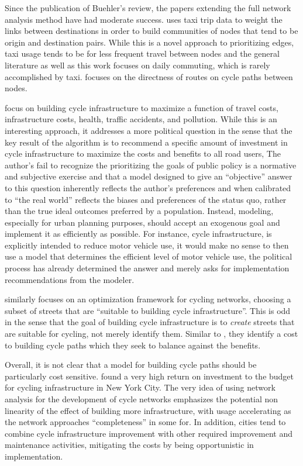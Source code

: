 Since the publication of Buehler's review, the papers extending the full network analysis method have had moderate success. \cite{akbarzadeh2018designing} uses taxi trip data to weight the links between destinations in order to build communities of nodes that tend to be origin and destination pairs. While this is a novel approach to prioritizing edges, taxi usage tends to be for less frequent travel between nodes and the general literature as well as this work focuses on daily commuting, which is rarely accomplished by taxi. \cite{boisjoly2019bicycle} focuses on the directness of routes on cycle paths between nodes. 

\cite{doorley2019designing} focus on building cycle infrastructure to maximize a function of travel costs, infrastructure costs, health, traffic accidents, and pollution. While this is an interesting approach, it addresses a more political question in the sense that the key result of the algorithm is to recommend a specific amount of investment in cycle infrastructure to maximize the costs and benefits to all road users, The author's fail to recognize the prioritizing the goals of public policy is a normative and subjective exercise and that a model designed to give an ``objective'' answer to this question inherently reflects the author's preferences and when calibrated to ``the real world'' reflects the biases and preferences of the status quo, rather than the true ideal outcomes preferred by a population. Instead, modeling, especially for urban planning purposes, should accept an exogenous goal and implement it as efficiently as possible. For instance, cycle infrastructure, is explicitly intended to reduce motor vehicle use, it would make no sense to then use a model that determines the efficient level of motor vehicle use, the political process has already determined the answer and merely asks for implementation recommendations from the modeler. 

\cite{mauttone2017bicycle} similarly focuses on an optimization framework for cycling networks, choosing a subset of streets that are ``suitable to building cycle infrastructure''. This is odd in the sense that the goal of building cycle infrastructure is to \textit{create} streets that are suitable for cycling, not merely identify them. Similar to \cite{doorley2019designing}, they identify a cost to building cycle paths which they seek to balance against the benefits. 

Overall, it is not clear that a model for building cycle paths should be particularly cost sensitive. \cite{gu2017cost} found a very high return on investment to the budget for cycling infrastructure in New York City. The very idea of using network analysis for the development of cycle networks emphasizes the potential non linearity of the effect of building more infrastructure, with usage accelerating as the network approaches ``completeness'' in some for. In addition, cities tend to combine cycle infrastructure improvement with other required improvement and maintenance activities, mitigating the costs by being opportunistic in implementation. 

